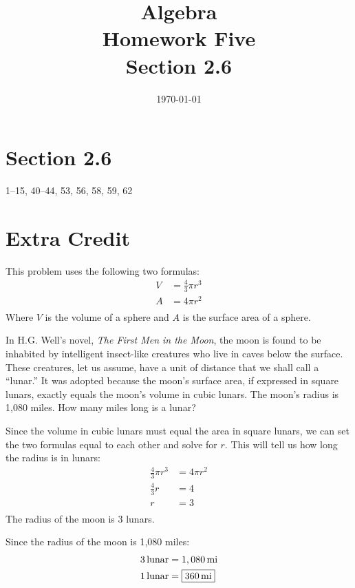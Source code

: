 \documentclass[letterpaper, landscape]{exam}
\title{Algebra \\ Homework Five \\ Section 2.6 }
\author{}
\date{\today}
\begin{document}
  \maketitle

  \section{Section 2.6}
  1--15, 40--44, 53, 56, 58, 59, 62

  \section{Extra Credit}

  This problem uses the following two formulas:
  \begin{align*}
    V & = \frac{4}{3} \pi r^3 \\
    A & = 4 \pi r^2 \\
  \end{align*}
  Where $V$ is the volume of a sphere and $A$ is the surface area of a sphere.

  In H.G. Well's novel, {\em The First Men in the Moon}, the moon is found
  to be inhabited by intelligent insect-like creatures who live in caves
  below the surface.  These creatures, let us assume, have a unit of
  distance that we shall call a ``lunar.''  It was adopted because the
  moon's surface area, if expressed in square lunars, exactly equals the
  moon's volume in cubic lunars.  The moon's radius is 1,080 miles.  How
  many miles long is a lunar?

  \begin{solution}
    Since the volume in cubic lunars must equal the area in square lunars,
    we can set the two formulas equal to each other and solve for $r$.
    This will tell us how long the radius is in lunars:
    \begin{align*}
      \frac{4}{3} \pi r^3 & = 4 \pi r^2 \\
      \frac{4}{3} r       & = 4 \\
      r                   & = 3 \\
    \end{align*}
    The radius of the moon is 3 lunars. 
    
    Since the radius of the moon is 1,080 miles:
    \begin{align*}
      \unit[3]{lunar} &= \unit[1,080]{mi} \\
      \unit[1]{lunar} &= \boxed{ \unit[360]{mi} } \\
    \end{align*}

  \end{solution}
\end{document}
